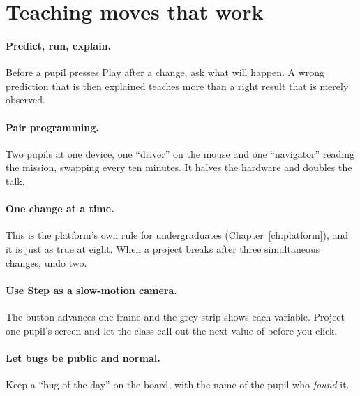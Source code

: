 \section{Teaching moves that work}

\paragraph{Predict, run, explain.} Before a pupil presses Play after a change,
ask what will happen. A wrong prediction that is then explained teaches more
than a right result that is merely observed.

\paragraph{Pair programming.} Two pupils at one device, one ``driver'' on the
mouse and one ``navigator'' reading the mission, swapping every ten minutes.
It halves the hardware and doubles the talk.

\paragraph{One change at a time.} This is the platform's own rule for
undergraduates (Chapter~\ref{ch:platform}), and it is just as true at eight.
When a project breaks after three simultaneous changes, undo two.

\paragraph{Use Step as a slow-motion camera.} The  button advances
one frame and the grey strip shows each variable. Project one pupil's screen
and let the class call out the next value of  before you click.

\paragraph{Let bugs be public and normal.} Keep a ``bug of the day'' on the
board, with the name of the pupil who \emph{found} it.

